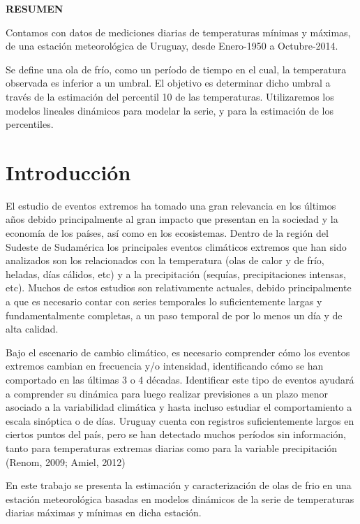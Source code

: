 \documentclass[12pt]{article}\usepackage[]{graphicx}\usepackage[]{color}
\begin{document}
\begin{center}
\textbf{RESUMEN}
\end{center}

Contamos con datos de mediciones diarias de temperaturas mínimas y máximas, de una estación meteorológica de Uruguay, desde Enero-1950 a Octubre-2014.

Se define una ola de frío, como un período de tiempo en el cual, la temperatura observada es inferior a un umbral. El objetivo es determinar dicho umbral a través de la estimación del percentil 10 de las temperaturas. Utilizaremos los modelos lineales dinámicos para modelar la serie, y para la estimación de los percentiles.

\section{Introducción}
El estudio de eventos extremos ha tomado una gran relevancia en los últimos años debido principalmente al gran impacto que presentan en la sociedad y la economía de los países, así como en los ecosistemas. Dentro de la región del Sudeste de Sudamérica los principales eventos climáticos extremos que han sido analizados son los relacionados con la temperatura (olas de calor y de frío, heladas, días cálidos, etc) y a la precipitación (sequías, precipitaciones intensas, etc). Muchos de estos estudios son relativamente actuales, debido principalmente a que es necesario contar con series temporales lo suficientemente largas y fundamentalmente completas, a un paso temporal de por lo menos un día y de alta calidad. 

Bajo el escenario de cambio climático, es necesario comprender cómo los eventos extremos cambian en frecuencia y/o intensidad, identificando cómo se han comportado en las últimas 3 o 4 décadas. Identificar este tipo de eventos ayudará a comprender su dinámica para luego realizar previsiones a un plazo menor asociado a la variabilidad climática y hasta incluso estudiar el comportamiento a escala sinóptica o de días. Uruguay cuenta con registros suficientemente largos en ciertos puntos del país, pero se han detectado muchos períodos sin información, tanto para temperaturas extremas diarias como para la variable precipitación (Renom, 2009; Amiel, 2012)

En este trabajo se presenta la estimación y caracterización de olas de frio en una estación meteorológica basadas en modelos dinámicos de la serie de temperaturas diarias máximas y mínimas en dicha estación. 
\end{document}
